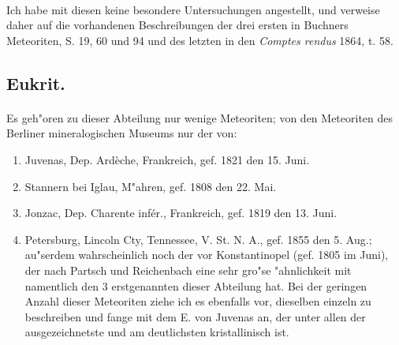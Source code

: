 \documentclass[a4paper, 11pt, oneside, german]{article}
\begin{document}
\paragraph{}
Ich habe mit diesen keine besondere Untersuchungen angestellt, und verweise daher auf die vorhandenen Beschreibungen der drei ersten in Buchners Meteoriten, S. 19, 60 und 94 und des letzten in den \emph{Comptes rendus} 1864, t. 58.
\subsection{Eukrit.}
\paragraph{}
Es geh"oren zu dieser Abteilung nur wenige Meteoriten; von den Meteoriten des Berliner mineralogischen Museums nur der von:
\begin{enumerate}
    \item Juvenas, Dep. Ardèche, Frankreich, gef. 1821 den 15. Juni.
    \item Stannern bei Iglau, M"ahren, gef. 1808 den 22. Mai.
    \item Jonzac, Dep. Charente infér., Frankreich, gef. 1819 den 13. Juni.
    \item Petersburg, Lincoln Cty, Tennessee, V. St. N. A., gef. 1855 den 5. Aug.; au"serdem wahrscheinlich noch der vor Konstantinopel (gef. 1805 im Juni), der nach Partsch und Reichenbach eine sehr gro"se "ahnlichkeit mit namentlich den 3 erstgenannten dieser Abteilung hat. Bei der geringen Anzahl dieser Meteoriten ziehe ich es ebenfalls vor, dieselben einzeln zu beschreiben und fange mit dem E. von Juvenas an, der unter allen der ausgezeichnetste und am deutlichsten kristallinisch ist.
\end{enumerate}
\end{document}
